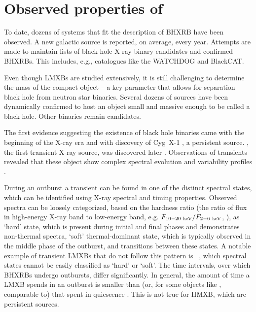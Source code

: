 \section{Observed properties of }
To date, dozens of systems that fit the description of \gls{BHXRB} have been observed.
A new galactic source is reported, on average, every year.
Attempts are made to maintain lists of black hole X-ray binary candidates and confirmed \glspl{BHXRB}.
This includes, e.g., catalogues like the \gls{WATCHDOG} and \gls{BlackCAT}.

Even though \glspl{LMXB} are studied extensively, it is still challenging to determine the mass of the compact object -- a key parameter that allows for separation black hole from neutron star binaries.
Several dozens of sources have been dynamically confirmed to host an object small and massive enough to be called a black hole.
Other binaries remain candidates.

The first evidence suggesting the existence of black hole binaries came with the beginning of the X-ray era and with discovery of Cyg~X-1  \citep{Bolton1972,Webster1972}, a persistent source.
\iA, the first transient X-ray source, was discovered later \citep{Elvis1975}.
Observations of transients revealed that these object show complex spectral evolution and variability profiles \citep{HBMB05,McClintock2006,Remillard2006,Belloni2010}.

During an outburst a transient can be found in one of the distinct spectral states, which can be identified using X-ray spectral and timing properties.
Observed spectra can be loosely categorized, based on the hardness ratio (the ratio of flux in high-energy X-ray band to low-energy band, e.g. $F_{10-20~\mathrm{keV}} / F_{2-6~\mathrm{keV}}$, \citealt{Tananbaum1972}), as `hard' state, which is  present during initial and final phases and demonstrates non-thermal spectra, `soft' thermal-dominant state, which is typically observed in the middle phase of the outburst, and transitions between these states. 
A notable example of transient \glspl{LMXB} that do not follow this pattern is \GRSxix\ \citep{Belloni2000}, which spectral states cannot be easily classified as `hard' or `soft'.
The time intervals, over which \glspl{BHXRB} undergo outbursts, differ significantly.
In general, the amount of time a \gls{LMXB} spends in an outburst is smaller than (or, for some objects like \SwiftJxvii, comparable to) that spent in quiescence \citep{Tetarenko2016}. 
This is not true for \gls{HMXB}, which are persistent sources.

